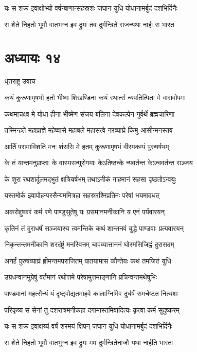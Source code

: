 \twolineshloka
{यः स शक्र इवाक्षोभ्यो वर्षन्बाणान्सहस्रशः}
{जघान युधि योधानामर्बुदं दशभिर्दिनैः}


\twolineshloka
{स शेते निहतो भूमौ वातभग्न इव द्रुमः}
{तव दुर्मन्त्रिते राजन्यथा नार्हः स भारत}


\chapter{अध्यायः १४}
\twolineshloka
{धृतराष्ट्र उवाच}
{}


\twolineshloka
{कथं कुरूणामृषभो हतो भीष्मः शिखण्डिना}
{कथं रथार्त्स न्यपतित्पिता मे वासवोपमः}


\twolineshloka
{कथमाचक्ष्व मे योधा हीना भीष्मेण संजय}
{बलिना देवकल्पेन गुर्वर्थे ब्रह्मचारिणा}


\twolineshloka
{तस्मिन्हते महाप्राज्ञे महेष्वासे महाबले}
{महासत्वे नरव्याघ्रे किमु आसीन्मनस्तव}


\twolineshloka
{आर्तिं परामाविशति मनः शंससि मे हतम्}
{कुरूणामृषभं वीरमकम्पं पुरुषर्षभम्}


\twolineshloka
{के तं यान्तमनुप्राप्ताः के वास्यसन्पुरोगमाः}
{केऽतिष्ठन्के न्यवर्तन्त केऽन्ववर्तन्त सञ्जय}


\twolineshloka
{के शूरा रथशार्दूलमद्भुतं क्षत्रियर्षभम्}
{तथाऽनीकं गाहमानं सहसा पृष्ठतोऽन्वयुः}


\twolineshloka
{यस्तमोर्क इवापोहन्परसैन्यममित्रहा}
{सहस्ररश्मिप्रतिमः परेषां भयमादधत्}


\twolineshloka
{अकरोद्दुष्करं कर्म रणे पाण्डुसुतेषु यः}
{ग्रसमानमनीकानि य एनं पर्यवारयन्}


\twolineshloka
{कृतिनं तं दुराधर्षं सञ्जयास्य त्वमन्तिके}
{कथं शान्तनवं युद्धे पाण्डवाः प्रत्यवारयन्}


\twolineshloka
{निकृन्तन्तमनीकानि शरदंष्ट्रं मनस्विनम्}
{चापव्यात्ताननं घोरमसिजिह्वं दुरासदम्}


\twolineshloka
{अनर्हं पुरुषव्याघ्रं ह्रीमन्तमपराजितम्}
{पातयामास कौन्तेयः कथं तमजितं युधि}


\twolineshloka
{उग्रधन्वानमुग्रेषुं वर्तमानं रथोत्तमे}
{परेषामुत्तमाङ्गानि प्रचिन्वन्तमथेषुभिः}


\twolineshloka
{पाण्डवानां महत्सैन्यं यं दृष्ट्वोद्यतमाहवे}
{कालाग्निमिव दुर्धर्षं समचेष्टत नित्यशः}


\twolineshloka
{परिकृष्य स सेनां तु दशरात्रमनीकहा}
{दगामास्तमिवादित्यः कृत्वा कर्म सुदुष्करम्}


\twolineshloka
{यः स शक्र इवाक्षय्यं वर्षं शरमयं क्षिपन्}
{जघान युधि योधानामर्बुदं दशभिर्दिनैः}


\twolineshloka
{स शेते निहतो भूमौ वातभुग्न इव द्रुमः}
{मम दुर्मन्त्रितेनाजौ यथा नार्हति भारतः}


